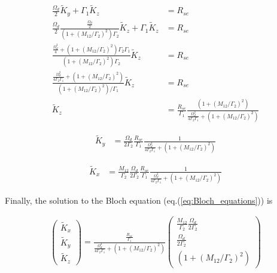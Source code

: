 \documentclass{article}
\begin{document}
\begin{align}
    \frac{\Omega_d}{2}\tilde{K}_{y} + \Gamma_1 \tilde{K}_{z} &= R_{se}\\
    \frac{\Omega_d}{2}\frac{\frac{\Omega_d}{2}}{\left(1 + \left(M_{12}/\Gamma_2\right)^2\right)\Gamma_2}\tilde{K}_{z} + \Gamma_1 \tilde{K}_{z} &= R_{se}\\
    \frac{\frac{\Omega_d^2}{4} + \left(1 + \left(M_{12}/\Gamma_2\right)^2\right)\Gamma_2\Gamma_1}{\left(1 + \left(M_{12}/\Gamma_2\right)^2\right)\Gamma_2} \tilde{K}_{z} &= R_{se}\\
    \frac{\frac{\Omega_d^2}{4\Gamma_2\Gamma_1} + \left(1 + \left(M_{12}/\Gamma_2\right)^2\right)}{\left(1 + \left(M_{12}/\Gamma_2\right)^2\right)/\Gamma_1} \tilde{K}_{z} &= R_{se}\\
     \tilde{K}_{z} &= \frac{R_{se}}{\Gamma_1} \frac{\left(1 + \left(M_{12}/\Gamma_2\right)^2\right)}{\frac{\Omega_d^2}{4\Gamma_2\Gamma_1} + \left(1 + \left(M_{12}/\Gamma_2\right)^2\right)}
\end{align}

\begin{align}
    \tilde{K}_{y} &=  \frac{\Omega_d}{2\Gamma_2}\frac{R_{se}}{\Gamma_1} \frac{1}{\frac{\Omega_d^2}{4\Gamma_2\Gamma_1} + \left(1 + \left(M_{12}/\Gamma_2\right)^2\right)}
\end{align}

\begin{align}
    \tilde{K}_{x} &= \frac{M_{12}}{\Gamma_2}\frac{\Omega_d}{2\Gamma_2}\frac{R_{se}}{\Gamma_1} \frac{1}{\frac{\Omega_d^2}{4\Gamma_2\Gamma_1} + \left(1 + \left(M_{12}/\Gamma_2\right)^2\right)}
\end{align}
    
Finally, the solution to the Bloch equation (eq.(\ref{eq:Bloch_equations})) is

\begin{align}
    \boxed{\left(\begin{array}{c}
        \tilde{K}_{x}\\
        \tilde{K}_{y}\\
        \tilde{K}_{z} 
    \end{array}\right)=
    \frac{\frac{R_{se}}{\Gamma_1}}{\frac{\Omega_d^2}{4\Gamma_2\Gamma_1} + \left(1 + \left(M_{12}/\Gamma_2\right)^2\right)}
    \left(\begin{array}{c}
      \frac{M_{12}}{\Gamma_2}\frac{\Omega_d}{2\Gamma_2} \\
       \frac{\Omega_d}{2\Gamma_2}\\
         \left(1 + \left(M_{12}/\Gamma_2\right)^2\right)
    \end{array}\right)}\label{eq:Bloch_solution}
\end{align}
\end{document}
